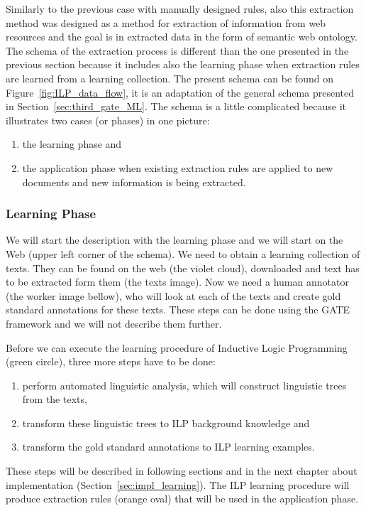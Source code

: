 Similarly to the previous case with manually designed rules, also this extraction method was designed as a method for extraction of information from web resources and the goal is in extracted data in the form of semantic web ontology. The schema of the extraction process is different than the one presented in the previous section because it includes also the learning phase when extraction rules are learned from a learning collection. The present schema can be found on Figure~\ref{fig:ILP_data_flow}, it is an adaptation of the general schema presented in Section~\ref{sec:third_gate_ML}. The schema is a little complicated because it illustrates two cases (or phases) in one picture:
\begin{enumerate}
	\item the learning phase and
	\item the application phase when existing extraction rules are applied to new documents and new information is being extracted.
\end{enumerate}

\subsubsection{Learning Phase}
We will start the description with the learning phase and we will start on the Web (upper left corner of the schema). We need to obtain a learning collection of texts. They can be found on the web (the violet cloud), downloaded and text has to be extracted form them (the texts image). Now we need a human annotator (the worker image bellow), who will look at each of the texts and create gold standard annotations for these texts. These steps can be done using the GATE framework and we will not describe them further. 

Before we can execute the learning procedure of Inductive Logic Programming (green circle), three more steps have to be done:
\begin{enumerate}
	\item perform automated linguistic analysis, which will construct linguistic trees from the texts,
	\item transform these linguistic trees to ILP background knowledge and
	\item transform the gold standard annotations to ILP learning examples.
\end{enumerate}
These steps will be described in following sections and in the next chapter about implementation (Section~\ref{sec:impl_learning}). The ILP learning procedure will produce extraction rules (orange oval) that will be used in the application phase.

